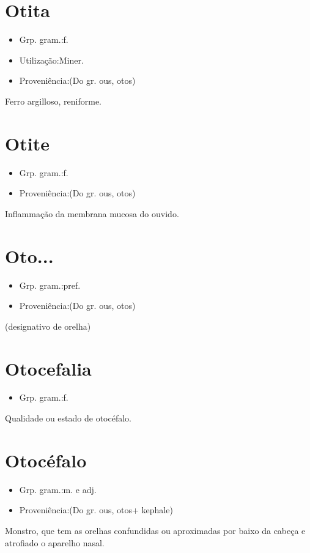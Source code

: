 \section{Otita}
\begin{itemize}
\item {Grp. gram.:f.}
\end{itemize}
\begin{itemize}
\item {Utilização:Miner.}
\end{itemize}
\begin{itemize}
\item {Proveniência:(Do gr. \textunderscore ous\textunderscore , \textunderscore otos\textunderscore )}
\end{itemize}
Ferro argilloso, reniforme.
\section{Otite}
\begin{itemize}
\item {Grp. gram.:f.}
\end{itemize}
\begin{itemize}
\item {Proveniência:(Do gr. \textunderscore ous\textunderscore , \textunderscore otos\textunderscore )}
\end{itemize}
Inflammação da membrana mucosa do ouvido.
\section{Oto...}
\begin{itemize}
\item {Grp. gram.:pref.}
\end{itemize}
\begin{itemize}
\item {Proveniência:(Do gr. \textunderscore ous\textunderscore , \textunderscore otos\textunderscore )}
\end{itemize}
(designativo de \textunderscore orelha\textunderscore )
\section{Otocefalia}
\begin{itemize}
\item {Grp. gram.:f.}
\end{itemize}
Qualidade ou estado de otocéfalo.
\section{Otocéfalo}
\begin{itemize}
\item {Grp. gram.:m.  e  adj.}
\end{itemize}
\begin{itemize}
\item {Proveniência:(Do gr. \textunderscore ous\textunderscore , \textunderscore otos\textunderscore  + \textunderscore kephale\textunderscore )}
\end{itemize}
Monstro, que tem as orelhas confundidas ou aproximadas por baixo da cabeça e atrofiado o aparelho nasal.
